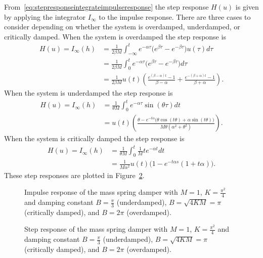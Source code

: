 From~\eqref{eq:stepresponseintegrateimpulseresponse} the step response $H(u)$ is given by applying the integrator $I_\infty$ to the impulse response.  There are three cases to consider depending on whether the system is overdamped, underdamped, or critically damped.  When the system is overdamped the step response is
\begin{align*}
H(u) = I_\infty(h) &= \frac{1}{2 \beta M} \int_{-\infty}^t e^{-\alpha \tau} \big( e^{\beta \tau} - e^{-\beta \tau} \big) u(\tau) d\tau \\
&= \frac{1}{2 \beta M} \int_{0}^t e^{-\alpha \tau} \big( e^{\beta \tau} - e^{-\beta \tau} \big) d\tau \\
&= \frac{1}{2 \beta M}u(t)\left( \frac{e^{(\beta-\alpha)t}- 1}{ \beta-\alpha} + \frac{e^{-(\beta+\alpha)t}- 1}{\beta+\alpha}\right).
\end{align*}
When the system is underdamped the step response is
\begin{align*}
H(u) = I_\infty(h) &= \frac{1}{ \theta M} \int_{0}^t e^{-\alpha \tau} \sin(\theta \tau) dt \\
&= u(t) \left(\frac{\theta - e^{-t \alpha } \big(\theta  \cos(t \theta)+\alpha  \sin(t \theta)\big)}{M \theta(\alpha ^2+\theta ^2)} \right).
\end{align*}
When the system is critically damped the step response is
\begin{align*}
H(u) = I_\infty(h) &= \frac{1}{ \theta M} \int_{0}^t \frac{1}{M} t e^{-\alpha t} dt \\
&= \frac{1}{M\alpha^2}u(t)\big(1 - e^{-t\alpha s}(1+t\alpha) \big).
\end{align*}
These step responses are plotted in Figure~\ref{fig:masspringdamperoscillatorystepresp}.

\begin{figure}[p]
\centering
{}
\caption{Impulse response of the mass spring damper with $M=1$, $K=\frac{\pi^2}{4}$ and damping constant $B=\tfrac{\pi}{3}$ (underdamped), $B = \sqrt{4KM} = \pi$ (critically damped), and $B = 2\pi$ (overdamped).} \label{fig:masspringdamperoscillatory}
\end{figure}

\begin{figure}[p]
\centering
{}
\caption{Step response of the mass spring damper with $M=1$, $K=\frac{\pi^2}{4}$ and damping constant $B=\tfrac{\pi}{3}$ (underdamped), $B = \sqrt{4KM} = \pi$ (critically damped), and $B = 2\pi$ (overdamped).} \label{fig:masspringdamperoscillatorystepresp}
\end{figure}


